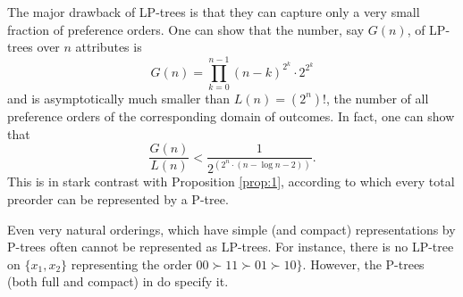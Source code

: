 The major drawback of LP-trees is that they can capture only a very small
fraction of preference orders. One can show that the number, say $G(n)$, 
of LP-trees over $n$ attributes is 
\begin{equation*}
G(n)=\prod_{k=0}^{n-1} (n-k)^{2^k} \cdot 2^{2^k}
\end{equation*}
and is asymptotically much smaller than $L(n)=(2^n)!$, the number of all 
preference orders of the corresponding domain of outcomes. In fact, 
one can show that 
\[
\frac{G(n)}{L(n)} < \frac{1}{2^{(2^n \cdot (n-\log n -2))}}.
\]
This is in stark contrast with Proposition \ref{prop:1}, according
to which every total preorder can be represented by a P-tree.

Even very natural orderings, which have simple (and compact) representations
by P-trees often cannot be represented as LP-trees. For instance, there is 
no LP-tree on $\{x_1,x_2\}$ representing the order $00\succ 11 \succ 01 
\succ 10\}$. However, the P-trees (both full and compact) in 
do specify it.


